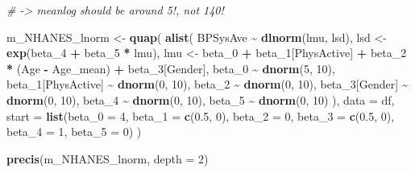 \documentclass[
]{book}
\newenvironment{Shaded}{\begin{snugshade}}{\end{snugshade}}
\newcommand{\AttributeTok}[1]{\textcolor[rgb]{0.13,0.29,0.53}{#1}}
\newcommand{\CommentTok}[1]{\textcolor[rgb]{0.56,0.35,0.01}{\textit{#1}}}
\newcommand{\DecValTok}[1]{\textcolor[rgb]{0.00,0.00,0.81}{#1}}
\newcommand{\FloatTok}[1]{\textcolor[rgb]{0.00,0.00,0.81}{#1}}
\newcommand{\FunctionTok}[1]{\textcolor[rgb]{0.13,0.29,0.53}{\textbf{#1}}}
\newcommand{\NormalTok}[1]{#1}
\newcommand{\OtherTok}[1]{\textcolor[rgb]{0.56,0.35,0.01}{#1}}
\newcommand{\SpecialCharTok}[1]{\textcolor[rgb]{0.81,0.36,0.00}{\textbf{#1}}}
\begin{document}
\begin{Shaded}
\begin{Highlighting}[]
\CommentTok{\# {-}\textgreater{} meanlog should be around 5!, not 140!}

\NormalTok{m\_NHANES\_lnorm }\OtherTok{\textless{}{-}} \FunctionTok{quap}\NormalTok{(}
  \FunctionTok{alist}\NormalTok{(}
\NormalTok{    BPSysAve }\SpecialCharTok{\textasciitilde{}} \FunctionTok{dlnorm}\NormalTok{(lmu, lsd),}
\NormalTok{    lsd }\OtherTok{\textless{}{-}} \FunctionTok{exp}\NormalTok{(beta\_4 }\SpecialCharTok{+}\NormalTok{ beta\_5 }\SpecialCharTok{*}\NormalTok{ lmu),}
\NormalTok{    lmu }\OtherTok{\textless{}{-}}\NormalTok{ beta\_0 }\SpecialCharTok{+}\NormalTok{ beta\_1[PhysActive] }\SpecialCharTok{+}\NormalTok{ beta\_2 }\SpecialCharTok{*}\NormalTok{ (Age }\SpecialCharTok{{-}}\NormalTok{ Age\_mean) }\SpecialCharTok{+}\NormalTok{ beta\_3[Gender],}
\NormalTok{    beta\_0 }\SpecialCharTok{\textasciitilde{}} \FunctionTok{dnorm}\NormalTok{(}\DecValTok{5}\NormalTok{, }\DecValTok{10}\NormalTok{),}
\NormalTok{    beta\_1[PhysActive] }\SpecialCharTok{\textasciitilde{}} \FunctionTok{dnorm}\NormalTok{(}\DecValTok{0}\NormalTok{, }\DecValTok{10}\NormalTok{),}
\NormalTok{    beta\_2 }\SpecialCharTok{\textasciitilde{}} \FunctionTok{dnorm}\NormalTok{(}\DecValTok{0}\NormalTok{, }\DecValTok{10}\NormalTok{),}
\NormalTok{    beta\_3[Gender] }\SpecialCharTok{\textasciitilde{}} \FunctionTok{dnorm}\NormalTok{(}\DecValTok{0}\NormalTok{, }\DecValTok{10}\NormalTok{),}
\NormalTok{    beta\_4 }\SpecialCharTok{\textasciitilde{}} \FunctionTok{dnorm}\NormalTok{(}\DecValTok{0}\NormalTok{, }\DecValTok{10}\NormalTok{),}
\NormalTok{    beta\_5 }\SpecialCharTok{\textasciitilde{}} \FunctionTok{dnorm}\NormalTok{(}\DecValTok{0}\NormalTok{, }\DecValTok{10}\NormalTok{)}
\NormalTok{  ),}
  \AttributeTok{data =}\NormalTok{ df,}
  \AttributeTok{start =} \FunctionTok{list}\NormalTok{(}\AttributeTok{beta\_0 =} \DecValTok{4}\NormalTok{, }\AttributeTok{beta\_1 =} \FunctionTok{c}\NormalTok{(}\FloatTok{0.5}\NormalTok{, }\DecValTok{0}\NormalTok{), }
  \AttributeTok{beta\_2 =} \DecValTok{0}\NormalTok{, }\AttributeTok{beta\_3 =} \FunctionTok{c}\NormalTok{(}\FloatTok{0.5}\NormalTok{, }\DecValTok{0}\NormalTok{), }\AttributeTok{beta\_4 =} \DecValTok{1}\NormalTok{, }\AttributeTok{beta\_5 =} \DecValTok{0}\NormalTok{)}
\NormalTok{)}

\FunctionTok{precis}\NormalTok{(m\_NHANES\_lnorm, }\AttributeTok{depth =} \DecValTok{2}\NormalTok{)}
\end{Highlighting}
\end{Shaded}
\end{document}
